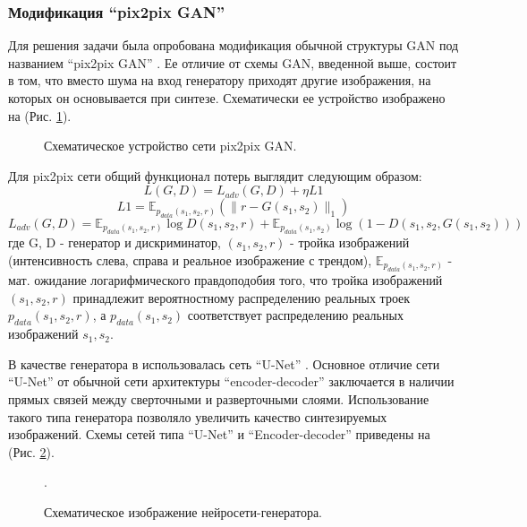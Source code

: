 		\subsubsection{Модификация ``pix2pix GAN''}
			Для решения задачи была опробована модификация обычной структуры GAN под названием ``pix2pix GAN'' \cite{pix2pix, p2p-vessnet}. Ее отличие от схемы GAN, введенной выше, состоит в том, что вместо шума на вход генератору приходят другие изображения, на которых он основывается при синтезе. Схематически ее устройство изображено на (Рис. \ref{5-p2p}).
	
			\begin{figure}[h!]
				\caption{Схематическое устройство сети pix2pix GAN.}
				\label{5-p2p}
			\end{figure}
	
			Для pix2pix сети общий функционал потерь выглядит следующим образом: $$ L(G, D) = L_{adv}(G, D) + \eta L1$$
			$$L1 = \mathbb{E}_{p_{data}(s_1, s_2, r)} (\parallel r - G(s_1, s_2) \parallel_1)$$
			$$ L_{adv}(G, D) = \mathbb{E}_{p_{data}(s_1, s_2, r)}\log D(s_1, s_2, r) +  \mathbb{E}_{p_{data}(s_1, s_2)} \log (1 - D(s_1, s_2, G(s_1, s_2)))$$
			где G, D - генератор и дискриминатор, $(s_1, s_2, r)$ - тройка изображений (интенсивность слева, справа и реальное изображение с трендом),  $\mathbb{E}_{p_{data}(s_1, s_2, r)}$ - мат. ожидание логарифмического правдоподобия того, что тройка изображений $(s_1, s_2, r)$ принадлежит вероятностному распределению реальных троек $p_{data}(s_1, s_2, r)$, а $p_{data}(s_1, s_2)$ соответствует распределению реальных изображений $s_1, s_2$.
	
			В качестве генератора в \cite{pix2pix, p2p-vessnet} использовалась сеть ``U-Net'' \cite{unet}. Основное отличие сети ``U-Net'' от обычной сети архитектуры ``encoder-decoder'' заключается в наличии прямых связей между сверточными и разверточными слоями. Использование такого типа генератора позволяло увеличить качество синтезируемых изображений. Схемы сетей типа ``U-Net'' и ``Encoder-decoder'' приведены на (Рис. \ref{5-unet-sheme}).
			
			\begin{figure}[h!]
				\caption{Схематическое изображение нейросети-генератора.}
				\label{5-unet-sheme}.
			\end{figure}